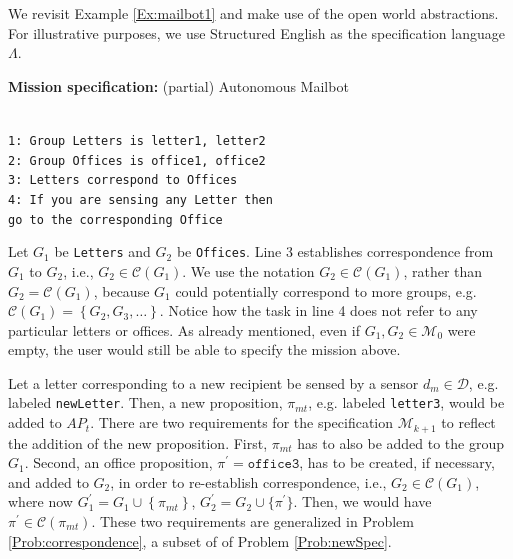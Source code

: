 \begin{myExample}\label{Ex:mailbot2}We revisit Example \ref{Ex:mailbot1} and make use of the open world abstractions. For illustrative purposes, we use Structured English \cite{KGFP2008AR} as the specification language $\Lambda$.
\vspace{-5 pt}
\begin{algorithm}
\textbf{Mission specification:} (partial) Autonomous Mailbot
	
	\vspace{-6 pt}
	\hrulefill\\
	{\small
\texttt{1: Group Letters is letter1, letter2} \\
\texttt{2: Group Offices is office1, office2} \\
\texttt{3: Letters correspond to Offices} \\
\texttt{4: If you are sensing any Letter then}\\
\texttt{go to the corresponding Office}\\ 
}
\vspace{-10 pt}
\end{algorithm}
\vspace{-10 pt}

Let $G_1$ be \texttt{Letters} and $G_2$ be \texttt{Offices}. Line 3 establishes correspondence from $G_1$ to $G_2$, i.e., $G_2 \in \mathcal{C}(G_1)$. We use the notation $G_2 \in \mathcal{C}(G_1)$, rather than $G_2 = \mathcal{C}(G_1)$, because $G_1$ could potentially correspond to more groups, e.g. $\mathcal{C}(G_1) = \left\{ G_2, G_3, \ldots\right\}$. 
Notice how the task in line 4 does not refer to any particular letters or offices. 
As already mentioned, even if $G_1, G_2 \in \mathcal{M}_0$ were empty, the user would still be able to specify the mission above.
\end{myExample}

Let a letter corresponding to a new recipient be sensed by a sensor $d_{m} \in \mathcal{D}$, e.g. labeled \texttt{newLetter}. Then, a new proposition, $\pi_{mt}$, e.g. labeled \texttt{letter3}, would be added to $AP_t$. 
There are two requirements for the specification $\mathcal{M}_{k+1}$ to reflect the addition of the new proposition. 
First, $\pi_{mt}$ has to also be added to the group $G_1$. 
Second, an office proposition, $\pi^\prime = \texttt{office3}$, has to be created, if necessary, and added to $G_2$, in order to re-establish correspondence, i.e., $G_2 \in \mathcal{C}(G_1)$, where now $G_{1}^\prime = G_1 \cup \left\{ \pi_{mt} \right\}$, $G_{2}^\prime = G_2 \cup \{ \pi^\prime \}$. 
Then, we would have $\pi^\prime \in \mathcal{C}(\pi_{mt})$. 
These two requirements are generalized in Problem \ref{Prob:correspondence}, a subset of of Problem \ref{Prob:newSpec}.


